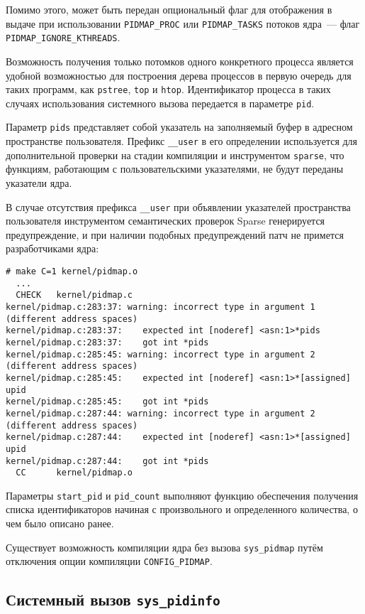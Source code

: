 Помимо этого, может быть передан опциональный флаг для отображения в выдаче
при использовании \texttt{PIDMAP\_PROC} или \texttt{PIDMAP\_TASKS} потоков
ядра~--- флаг \texttt{PIDMAP\_IGNORE\_KTHREADS}.

Возможность получения только потомков одного конкретного процесса является
удобной возможностью для построения дерева процессов в первую очередь для таких
программ, как \texttt{pstree}, \texttt{top} и \texttt{htop}. Идентификатор
процесса в таких случаях использования системного вызова передается в параметре
\texttt{pid}.

Параметр \texttt{pids} представляет собой указатель на заполняемый буфер в
адресном пространстве пользователя. Префикс \texttt{\_\_user} в его определении
используется для дополнительной проверки на стадии компиляции и инструментом
\texttt{sparse}, что функциям, работающим с пользовательскими указателями, не
будут переданы указатели ядра.

В случае отсутствия префикса \texttt{\_\_user} при объявлении указателей
пространства пользователя инструментом семантических проверок Sparse
генерируется предупреждение, и при наличии подобных предупреждений патч не
примется разработчиками ядра:

\medskip
\begin{lstlisting}[style=cstyle]
# make C=1 kernel/pidmap.o
  ...
  CHECK   kernel/pidmap.c
kernel/pidmap.c:283:37: warning: incorrect type in argument 1 (different address spaces)
kernel/pidmap.c:283:37:    expected int [noderef] <asn:1>*pids
kernel/pidmap.c:283:37:    got int *pids
kernel/pidmap.c:285:45: warning: incorrect type in argument 2 (different address spaces)
kernel/pidmap.c:285:45:    expected int [noderef] <asn:1>*[assigned] upid
kernel/pidmap.c:285:45:    got int *pids
kernel/pidmap.c:287:44: warning: incorrect type in argument 2 (different address spaces)
kernel/pidmap.c:287:44:    expected int [noderef] <asn:1>*[assigned] upid
kernel/pidmap.c:287:44:    got int *pids
  CC      kernel/pidmap.o
\end{lstlisting}
\medskip

Параметры \texttt{start\_pid} и \texttt{pid\_count} выполняют функцию обеспечения
получения списка идентификаторов начиная с произвольного и определенного
количества, о чем было описано ранее.

Существует возможность компиляции ядра без вызова \texttt{sys\_pidmap} путём
отключения опции компиляции \texttt{CONFIG\_PIDMAP}.

\subsection{Системный вызов \texttt{sys\_pidinfo}}

